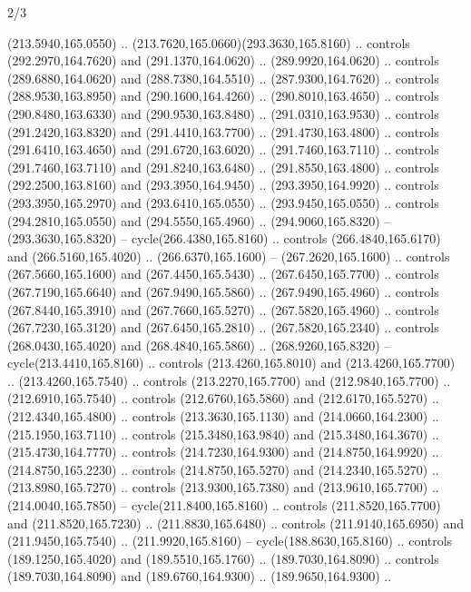 \begin{flagdescription}{2/3}
\begin{scope}[xshift=0.5\flaglength,yshift=0.5\flagwidth,scale=\flagwidth/259.2]
\begin{scope}[y=0.8pt, x=0.8pt, yscale=-1,shift={(-243,-162)}]
      (213.5940,165.0550) .. (213.7620,165.0660)(293.3630,165.8160) .. controls
      (292.2970,164.7620) and (291.1370,164.0620) .. (289.9920,164.0620) .. controls
      (289.6880,164.0620) and (288.7380,164.5510) .. (287.9300,164.7620) .. controls
      (288.9530,163.8950) and (290.1600,164.4260) .. (290.8010,163.4650) .. controls
      (290.8480,163.6330) and (290.9530,163.8480) .. (291.0310,163.9530) .. controls
      (291.2420,163.8320) and (291.4410,163.7700) .. (291.4730,163.4800) .. controls
      (291.6410,163.4650) and (291.6720,163.6020) .. (291.7460,163.7110) .. controls
      (291.7460,163.7110) and (291.8240,163.6480) .. (291.8550,163.4800) .. controls
      (292.2500,163.8160) and (293.3950,164.9450) .. (293.3950,164.9920) .. controls
      (293.3950,165.2970) and (293.6410,165.0550) .. (293.9450,165.0550) .. controls
      (294.2810,165.0550) and (294.5550,165.4960) .. (294.9060,165.8320) --
      (293.3630,165.8320) -- cycle(266.4380,165.8160) .. controls
      (266.4840,165.6170) and (266.5160,165.4020) .. (266.6370,165.1600) --
      (267.2620,165.1600) .. controls (267.5660,165.1600) and (267.4450,165.5430) ..
      (267.6450,165.7700) .. controls (267.7190,165.6640) and (267.9490,165.5860) ..
      (267.9490,165.4960) .. controls (267.8440,165.3910) and (267.7660,165.5270) ..
      (267.5820,165.4960) .. controls (267.7230,165.3120) and (267.6450,165.2810) ..
      (267.5820,165.2340) .. controls (268.0430,165.4020) and (268.4840,165.5860) ..
      (268.9260,165.8320) -- cycle(213.4410,165.8160) .. controls
      (213.4260,165.8010) and (213.4260,165.7700) .. (213.4260,165.7540) .. controls
      (213.2270,165.7700) and (212.9840,165.7700) .. (212.6910,165.7540) .. controls
      (212.6760,165.5860) and (212.6170,165.5270) .. (212.4340,165.4800) .. controls
      (213.3630,165.1130) and (214.0660,164.2300) .. (215.1950,163.7110) .. controls
      (215.3480,163.9840) and (215.3480,164.3670) .. (215.4730,164.7770) .. controls
      (214.7230,164.9300) and (214.8750,164.9920) .. (214.8750,165.2230) .. controls
      (214.8750,165.5270) and (214.2340,165.5270) .. (213.8980,165.7270) .. controls
      (213.9300,165.7380) and (213.9610,165.7700) .. (214.0040,165.7850) --
      cycle(211.8400,165.8160) .. controls (211.8520,165.7700) and
      (211.8520,165.7230) .. (211.8830,165.6480) .. controls (211.9140,165.6950) and
      (211.9450,165.7540) .. (211.9920,165.8160) -- cycle(188.8630,165.8160) ..
      controls (189.1250,165.4020) and (189.5510,165.1760) .. (189.7030,164.8090) ..
      controls (189.7030,164.8090) and (189.6760,164.9300) .. (189.9650,164.9300) ..

\end{scope}
\end{scope}
\end{flagdescription}
